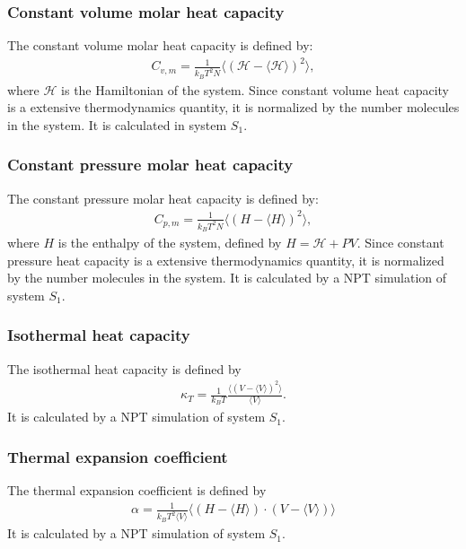 \documentclass[aip,jcp,a4paper,reprint,unsortedaddress,onecolumn,fleqn]{revtex4-1}
\newcommand{\systemsb}{S_1}
\begin{document}

\subsubsection{Constant volume molar heat capacity}
The constant volume molar heat capacity is defined by:
\begin{align}
  C_{v,m} = \frac{1}{k_BT^2 N} \langle (\mathcal H - \langle\mathcal H\rangle)^2 \rangle,
\end{align}
where $\mathcal H$ is the Hamiltonian of the system. Since constant
volume heat capacity is a extensive thermodynamics quantity, it is
normalized by the number molecules in the system.
It is calculated in system $\systemsb$.

\subsubsection{Constant pressure molar heat capacity}
The constant pressure molar heat capacity is defined by:
\begin{align}
  C_{p,m} = \frac{1}{k_BT^2 N} \langle ( H - \langle H\rangle)^2 \rangle,
\end{align}
where $ H$ is the enthalpy of the system, defined by $H = \mathcal H + PV$. Since constant
pressure heat capacity is a extensive thermodynamics quantity, it is
normalized by the number molecules in the system.
It is calculated by a NPT simulation of  system $\systemsb$.


\subsubsection{Isothermal heat capacity}
The isothermal heat capacity is defined by
\begin{align}
  \kappa_T = \frac{1}{k_BT} \frac{\langle (V - \langle V\rangle)^2 \rangle}{\langle V\rangle}.
\end{align}
It is calculated by a NPT simulation of  system $\systemsb$.


\subsubsection{Thermal expansion coefficient}
The thermal expansion coefficient is defined by
\begin{align}
  \alpha = \frac{1}{k_BT^2\langle V\rangle} \langle (H - \langle H\rangle)\cdot(V - \langle V\rangle) \rangle
\end{align}
It is calculated by a NPT simulation of  system $\systemsb$.
\end{document}
